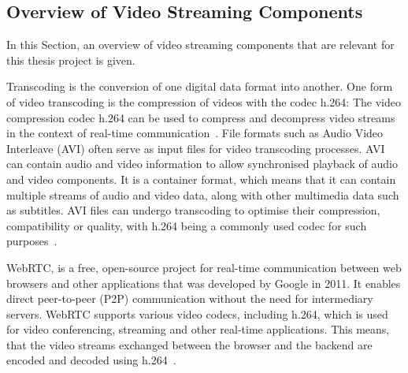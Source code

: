\documentclass[../MasterThesis.tex]{subfiles}
\begin{document}
\subsection{Overview of Video Streaming Components}
\label{subsection_OverviewVideoStreamingComponents}

In this Section, an overview of video streaming components that are relevant for this thesis project is given.

Transcoding is the conversion of one digital data format into another.
One form of video transcoding is the compression of videos with the codec h.264:
The video compression codec h.264 can be used to compress and decompress video streams in the context of real-time communication~\cite{transcoding, h264}.
%	
File formats such as Audio Video Interleave (AVI) often serve as input files for video transcoding processes.
AVI can contain audio and video information to allow synchronised playback of audio and video components. 
It is a container format, which means that it can contain multiple streams of audio and video data, along with other multimedia data such as subtitles.
AVI files can undergo transcoding to optimise their compression, compatibility or quality, with h.264 being a commonly used codec for such purposes~\cite{avi, h264}.


WebRTC, is a free, open-source project for real-time communication between web browsers and other applications that was developed by Google in 2011. It enables direct peer-to-peer (P2P) communication without the need for intermediary servers.
WebRTC supports various video codecs, including h.264, which is used for video conferencing, streaming and other real-time applications. This means, that the video streams exchanged between the browser and the backend are encoded and decoded using h.264~\cite{webrtc, h264}.






\end{document}
